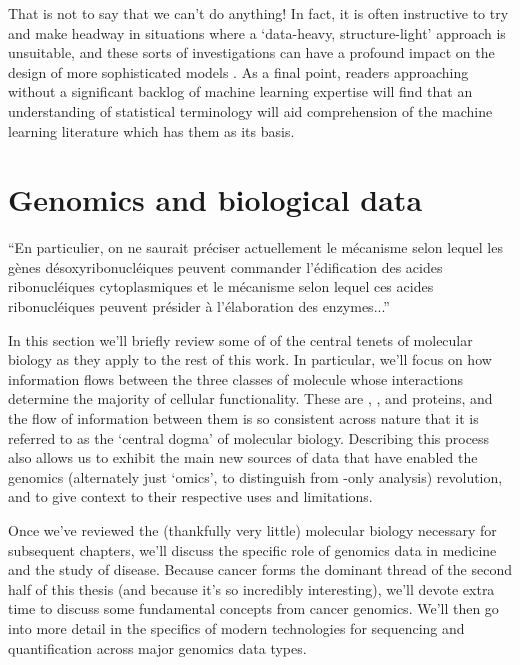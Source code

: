 \documentclass[thesis.tex]{subfiles}
\begin{document}
That is not to say that we can't do anything! In fact, it is often instructive to try and make headway in situations where a `data-heavy, structure-light' approach is unsuitable, and these sorts of investigations can have a profound impact on the design of more sophisticated models \citep{buhlmann_high-dimensional_2014}. As a final point, readers approaching without a significant backlog of machine learning expertise will find that an understanding of statistical terminology will aid comprehension of the machine learning literature which has them as its basis.

\section{Genomics and biological data}
\epigraph{``En particulier, on ne
saurait préciser actuellement le mécanisme selon lequel
les gènes désoxyribonucléiques peuvent commander l'édification des acides ribonucléiques cytoplasmiques et le
mécanisme selon lequel ces acides ribonucléiques
peuvent présider à l'élaboration des enzymes...''}{\citet{boivin_sur_1947}}

In this section we'll briefly review some of of the central tenets of molecular biology as they apply to the rest of this work. In particular, we'll focus on how information flows between the three classes of molecule whose interactions determine the majority of cellular functionality. These are , , and proteins, and the flow of information between them is so consistent across nature that it is referred to as the `central dogma' of molecular biology. Describing this process also allows us to exhibit the main new sources of data that have enabled the genomics (alternately just `omics', to distinguish from -only analysis) revolution, and to give context to their respective uses and limitations. 

Once we've reviewed the (thankfully very little) molecular biology necessary for subsequent chapters, we'll discuss the specific role of genomics data in medicine and the study of disease. Because cancer forms the dominant thread of the second half of this thesis (and because it's so incredibly interesting), we'll devote extra time to discuss some fundamental concepts from cancer genomics. We'll then go into more detail in the specifics of modern technologies for sequencing and quantification across major genomics data types.
\end{document}
